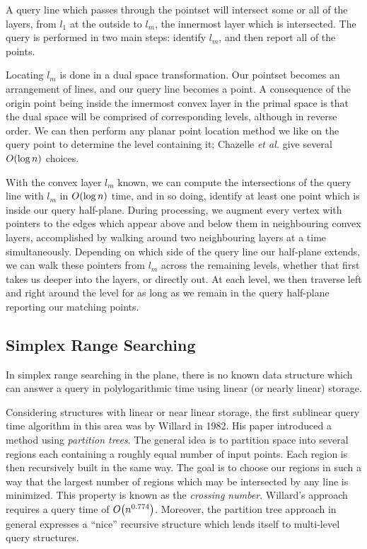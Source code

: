 A query line which passes through the pointset will intersect some or all of the layers, from $l_1$ at the outside to $l_m$, the innermost layer which is intersected.
The query is performed in two main steps: identify $l_m$, and then report all of the points.

Locating $l_m$ is done in a dual space transformation.
Our pointset becomes an arrangement of lines, and our query line becomes a point.
A consequence of the origin point being inside the innermost convex layer in the primal space is that the dual space will be comprised of corresponding levels, although in reverse order.
We can then perform any planar point location method we like on the query point to determine the level containing it; Chazelle \emph{et al.} give several $O\!\left(\log{n}\right)$ choices.

With the convex layer $l_m$ known, we can compute the intersections of the query line with $l_m$ in $O\!\left(\log{n}\right)$ time, and in so doing, identify at least one point which is inside our query half-plane.
During processing, we augment every vertex with pointers to the edges which appear above and below them in neighbouring convex layers, accomplished by walking around two neighbouring layers at a time simultaneously.
Depending on which side of the query line our half-plane extends, we can walk these pointers from $l_m$ across the remaining levels, whether that first takes us deeper into the layers, or directly out.
At each level, we then traverse left and right around the level for as long as we remain in the query half-plane reporting our matching points.


\subsection*{Simplex Range Searching}

In simplex range searching in the plane, there is no known data structure which can answer a query in polylogarithmic time using linear (or nearly linear) storage.\cite{Agarwal99}  

Considering structures with linear or near linear storage, the first sublinear query time algorithm in this area was by Willard in 1982\cite{Willard82}.
His paper introduced a method using \emph{partition trees}.
The general idea is to partition space into several regions each containing a roughly equal number of input points.
Each region is then recursively built in the same way.
The goal is to choose our regions in such a way that the largest number of regions which may be intersected by any line is minimized.  
This property is known as the \emph{crossing number}.
Willard's approach requires a query time of $O\!\left(n^{0.774}\right)$.
Moreover, the partition tree approach in general expresses a ``nice'' recursive structure which lends itself to multi-level query structures.


